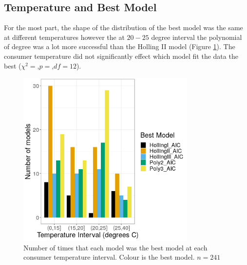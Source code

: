 \documentclass{article}
\begin{document}
\subsection{Temperature and Best Model}
For the most part, the shape of the distribution of the best model was the same at different temperatures however the at $20-25$ degree interval the polynomial of degree was a lot more successful than the  Holling II model (Figure \ref{fig:tempmodel}). The consumer temperature did not significantly effect which model fit the data the best ($\chi^2=$,$p=$,$df=12$). 
\begin{figure}[h!] %
    \centering
    \includegraphics[width=3.5in]{../Results/Plots/tempmodel.png}
    \caption{Number of times that each model was the best model at each consumer temperature interval. Colour is the best model. $n=241$}
    \label{fig:tempmodel}
\end{figure}
\end{document}
